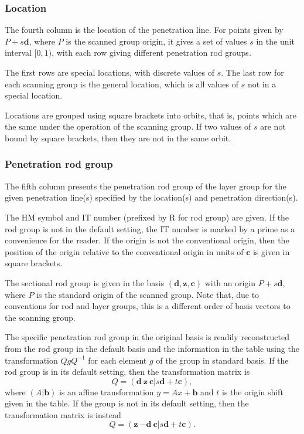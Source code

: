 \subsubsection{Location}

The fourth column is the location of the penetration line.
For points given by $P+s\mathbf{d}$, where $P$ is the scanned group origin, it gives a set of values $s$ in the unit interval $[0,1)$, with each row giving different penetration rod groups.

The first rows are special locations, with discrete values of $s$.
The last row for each scanning group is the general location, which is all values of $s$ not in a special location.

Locations are grouped using square brackets into orbits, that is, points which are the same under the operation of the scanning group.
If two values of $s$ are not bound by square brackets, then they are not in the same orbit.

\subsubsection{Penetration rod group}

The fifth column presents the penetration rod group of the layer group for the given penetration line(s) specified by the location(s) and penetration direction(s).

The HM symbol and IT number (prefixed by R for rod group) are given.
If the rod group is not in the default setting, the IT number is marked by a prime as a convenience for the reader.
If the origin is not the conventional origin, then the position of the origin relative to the conventional origin in units of $\mathbf{c}$ is given in square brackets.

The sectional rod group is given in the basis $(\mathbf{d},\mathbf{z},\mathbf{c})$ with an origin $P+s\mathbf{d}$, where $P$ is the standard origin of the scanned group.
Note that, due to conventions for rod and layer groups, this is a different order of basis vectors to the scanning group.

The specific penetration rod group in the original basis is readily reconstructed from the rod group in the default basis and the information in the table using the transformation $Q g Q^{-1}$ for each element $g$ of the group in standard basis.
If the rod group is in its default setting, then the transformation matrix is
\begin{equation}
	Q = \left(\mathbf{d}\ \mathbf{z}\ \mathbf{c} | s\mathbf{d} + t\mathbf{c}\right),
\end{equation}
where $(A|\mathbf{b})$ is an affine transformation $y = Ax + \mathbf{b}$ and $t$ is the origin shift given in the table.
If the group is not in its default setting, then the transformation matrix is instead
\begin{equation}
	Q = \left(\mathbf{z}\ {-\mathbf{d}}\ \mathbf{c} | s\mathbf{d} + t\mathbf{c}\right).
\end{equation}


